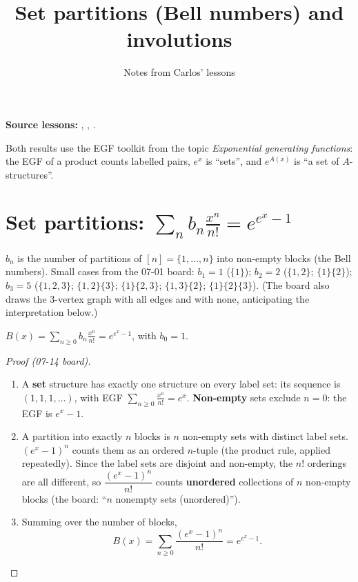 \documentclass[11pt]{article}
\title{Set partitions (Bell numbers) and involutions}
\author{Notes from Carlos' lessons}
\date{}
\begin{document}
\maketitle

\textbf{Source lessons:}
,
,
.

\medskip
Both results use the EGF toolkit from the topic \emph{Exponential generating functions}: the EGF of a product counts labelled pairs, $e^x$ is ``sets'', and $e^{A(x)}$ is ``a set of $A$-structures''.

\section{Set partitions: $\displaystyle\sum_n b_n\frac{x^n}{n!}=e^{e^x-1}$}

$b_n$ is the number of partitions of $[n]=\{1,\dots,n\}$ into non-empty blocks (the Bell numbers). Small cases from the 07-01 board: $b_1=1$ ($\{1\}$); $b_2=2$ ($\{1,2\}$; $\{1\}\{2\}$); $b_3=5$ ($\{1,2,3\}$; $\{1,2\}\{3\}$; $\{1\}\{2,3\}$; $\{1,3\}\{2\}$; $\{1\}\{2\}\{3\}$). (The board also draws the $3$-vertex graph with all edges and with none, anticipating the interpretation below.)

\begin{theorem}
$B(x)=\sum_{n\ge0}b_n\frac{x^n}{n!}=e^{e^x-1}$, with $b_0=1$.
\end{theorem}
\begin{proof}[Proof (07-14 board)]
\begin{enumerate}[nosep]
  \item A \textbf{set} structure has exactly one structure on every label set: its sequence is $(1,1,1,\dots)$, with EGF $\sum_{n\ge0}\frac{x^n}{n!}=e^x$. \textbf{Non-empty} sets exclude $n=0$: the EGF is $e^x-1$.
  \item A partition into exactly $n$ blocks is $n$ non-empty sets with distinct label sets. $(e^x-1)^n$ counts them as an ordered $n$-tuple (the product rule, applied repeatedly). Since the label sets are disjoint and non-empty, the $n!$ orderings are all different, so $\dfrac{(e^x-1)^n}{n!}$ counts \textbf{unordered} collections of $n$ non-empty blocks (the board: ``$n$ nonempty sets (unordered)'').
  \item Summing over the number of blocks,
  \[
  B(x)=\sum_{n\ge0}\frac{(e^x-1)^n}{n!}=e^{e^x-1}.
  \]
\end{enumerate}
\end{proof}
\end{document}
